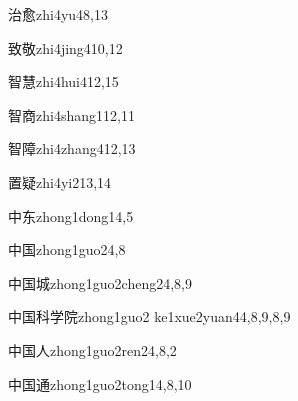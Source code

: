 \begin{entry}{治愈}{zhi4yu4}{8,13}
\end{entry}

\begin{entry}{致敬}{zhi4jing4}{10,12}
\end{entry}

\begin{entry}{智慧}{zhi4hui4}{12,15}
\end{entry}

\begin{entry}{智商}{zhi4shang1}{12,11}
\end{entry}

\begin{entry}{智障}{zhi4zhang4}{12,13}
\end{entry}

\begin{entry}{置疑}{zhi4yi2}{13,14}
\end{entry}

\begin{entry}{中东}{zhong1dong1}{4,5}
\end{entry}

\begin{entry}{中国}{zhong1guo2}{4,8}
\end{entry}

\begin{entry}{中国城}{zhong1guo2cheng2}{4,8,9}
\end{entry}

\begin{entry}{中国科学院}{zhong1guo2 ke1xue2yuan4}{4,8,9,8,9}
\end{entry}

\begin{entry}{中国人}{zhong1guo2ren2}{4,8,2}
\end{entry}

\begin{entry}{中国通}{zhong1guo2tong1}{4,8,10}
\end{entry}

